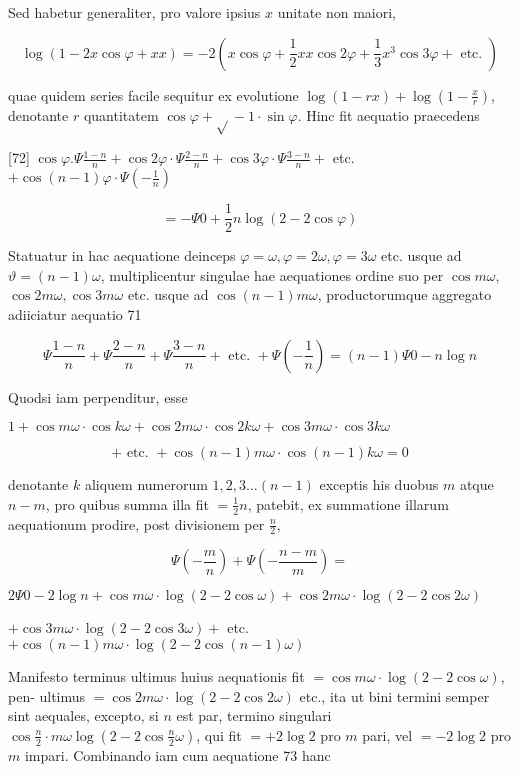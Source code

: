 \documentclass[10pt]{article}
\begin{document}
Sed habetur generaliter, pro valore ipsius \(x\) unitate non maiori,

\[
\log (1-2 x \cos \varphi+x x)=-2\left(x \cos \varphi+\frac{1}{2} x x \cos 2 \varphi+\frac{1}{3} x^{3} \cos 3 \varphi+\text { etc. }\right)
\]

quae quidem series facile sequitur ex evolutione \(\log (1-r x)+\log \left(1-\frac{x}{r}\right)\), denotante \(r\) quantitatem \(\cos \varphi+\sqrt{ }-1 \cdot \sin \varphi\). Hinc fit aequatio praecedens

[72] \(\cos \varphi . \Psi \frac{1-n}{n}+\cos 2 \varphi \cdot \Psi \frac{2-n}{n}+\cos 3 \varphi \cdot \Psi \frac{3-n}{n}+\) etc. \(+\cos (n-1) \varphi \cdot \Psi\left(-\frac{1}{n}\right)\)

\[
=-\Psi 0+\frac{1}{2} n \log (2-2 \cos \varphi)
\]

Statuatur in hac aequatione deinceps \(\varphi=\omega, \varphi=2 \omega, \varphi=3 \omega\) etc. usque ad \(\vartheta=(n-1) \omega\), multiplicentur singulae hae aequationes ordine suo per \(\cos m \omega\), \(\cos 2 m \omega, \cos 3 m \omega\) etc. usque ad \(\cos (n-1) m \omega\), productorumque aggregato adiiciatur aequatio 71

\[
\Psi \frac{1-n}{n}+\Psi \frac{2-n}{n}+\Psi \frac{3-n}{n}+\text { etc. }+\Psi\left(-\frac{1}{n}\right)=(n-1) \Psi 0-n \log n
\]

Quodsi iam perpenditur, esse

\(1+\cos m \omega \cdot \cos k \omega+\cos 2 m \omega \cdot \cos 2 k \omega+\cos 3 m \omega \cdot \cos 3 k \omega\)

\[
+ \text { etc. }+\cos (n-1) m \omega \cdot \cos (n-1) k \omega=0
\]

denotante \(k\) aliquem numerorum \(1,2,3 \ldots(n-1)\) exceptis his duobus \(m\) atque \(n-m\), pro quibus summa illa fit \(=\frac{1}{2} n\), patebit, ex summatione illarum aequationum prodire, post divisionem per \(\frac{n}{2}\),

\[
\Psi\left(-\frac{m}{n}\right)+\Psi\left(-\frac{n-m}{m}\right)=
\]

\(2 \Psi 0-2 \log n+\cos m \omega \cdot \log (2-2 \cos \omega)+\cos 2 m \omega \cdot \log (2-2 \cos 2 \omega)\)

\(+\cos 3 m \omega \cdot \log (2-2 \cos 3 \omega)+\) etc. \(+\cos (n-1) m \omega \cdot \log (2-2 \cos (n-1) \omega)\)

Manifesto terminus ultimus huius aequationis fit \(=\cos m \omega \cdot \log (2-2 \cos \omega)\), pen-
ultimus \(=\cos 2 m \omega \cdot \log (2-2 \cos 2 \omega)\) etc., ita ut bini termini semper sint aequales, excepto, si \(n\) est par, termino singulari \(\cos \frac{n}{2} \cdot m \omega \log \left(2-2 \cos \frac{n}{2} \omega\right)\), qui fit \(=+2 \log 2\) pro \(m\) pari, vel \(=-2 \log 2\) pro \(m\) impari. Combinando iam cum aequatione 73 hanc
\end{document}
